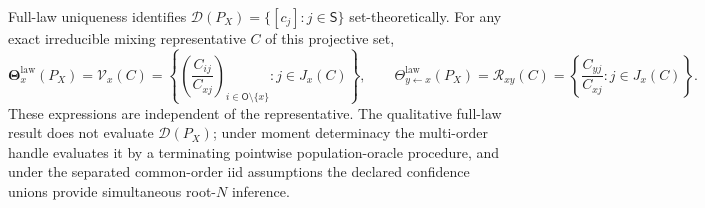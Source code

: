 Full-law uniqueness identifies \(\mathcal D(P_X)=\{[c_j]:j\in\mathsf S\}\) set-theoretically. For any exact irreducible mixing representative \(C\) of this projective set,
\[
 \boldsymbol\Theta_x^{\mathrm{law}}(P_X)
 =\mathcal V_x(C)
 =\left\{\left(\frac{C_{ij}}{C_{xj}}\right)_{i\in\mathsf O\setminus\{x\}}:j\in J_x(C)\right\},
 \qquad
 \Theta_{y\leftarrow x}^{\mathrm{law}}(P_X)
 =\mathcal R_{xy}(C)
 =\left\{\frac{C_{yj}}{C_{xj}}:j\in J_x(C)\right\}.
\]
These expressions are independent of the representative. The qualitative full-law result does not evaluate \(\mathcal D(P_X)\); under moment determinacy the multi-order handle evaluates it by a terminating pointwise population-oracle procedure, and under the separated common-order iid assumptions the declared confidence unions provide simultaneous root-\(N\) inference.